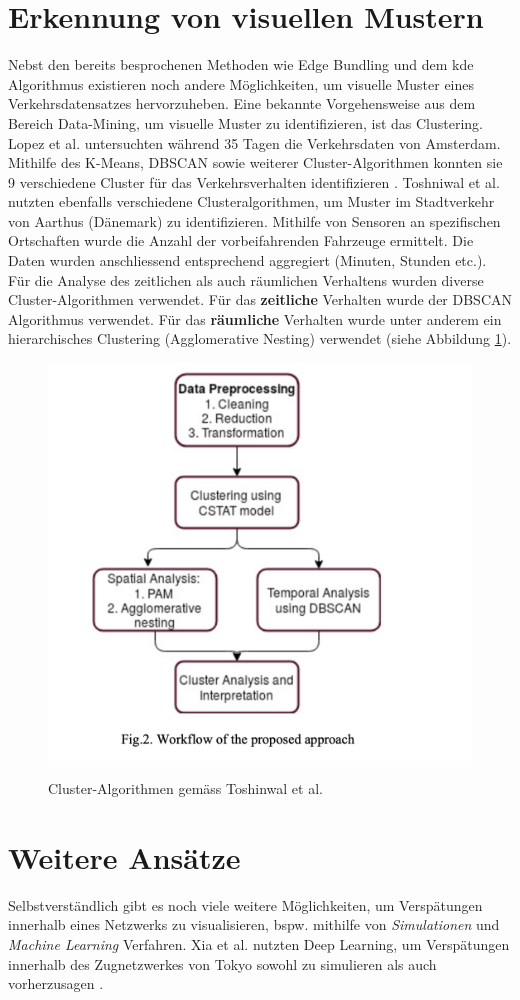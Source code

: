 \section{Erkennung von visuellen Mustern}
Nebst den bereits besprochenen Methoden wie Edge Bundling und dem \acrshort{kde} Algorithmus existieren noch andere Möglichkeiten, um visuelle Muster eines Verkehrsdatensatzes hervorzuheben. Eine bekannte Vorgehensweise aus dem Bereich Data-Mining, um visuelle Muster zu identifizieren, ist das Clustering. Lopez et al. untersuchten während 35 Tagen die Verkehrsdaten von Amsterdam. Mithilfe des K-Means, DBSCAN sowie weiterer Cluster-Algorithmen konnten sie 9 verschiedene Cluster für das Verkehrsverhalten identifizieren \parencite{lopez_2017}. Toshniwal et al. nutzten ebenfalls verschiedene Clusteralgorithmen, um Muster im Stadtverkehr von Aarthus (Dänemark) zu identifizieren. Mithilfe von Sensoren an spezifischen Ortschaften wurde die Anzahl der vorbeifahrenden Fahrzeuge ermittelt. Die Daten wurden anschliessend entsprechend aggregiert (Minuten, Stunden etc.). Für die Analyse des zeitlichen als auch räumlichen Verhaltens wurden diverse Cluster-Algorithmen verwendet. Für das \textbf{zeitliche} Verhalten wurde der DBSCAN Algorithmus verwendet. Für das \textbf{räumliche} Verhalten wurde unter anderem ein hierarchisches Clustering (Agglomerative Nesting) verwendet (siehe Abbildung \ref{fig_clustering_urban_traffic}).

\begin{figure}[H]
    \caption{Cluster-Algorithmen gemäss Toshinwal et al. \parencite[S. 1050]{clustering_urban_traffic_data}}
    \includegraphics[width=.5\linewidth]{content/00_assets/urban_traffic_clustering_methods.png}
    \label{fig_clustering_urban_traffic}
\end{figure}

\section{Weitere Ansätze}
Selbstverständlich gibt es noch viele weitere Möglichkeiten, um Verspätungen innerhalb eines Netzwerks zu visualisieren, bspw. mithilfe von \textit{Simulationen} und \textit{Machine Learning} Verfahren. Xia et al. nutzten Deep Learning, um Verspätungen innerhalb des Zugnetzwerkes von Tokyo sowohl zu simulieren als auch vorherzusagen \parencite[S.56]{xia_2018}.

